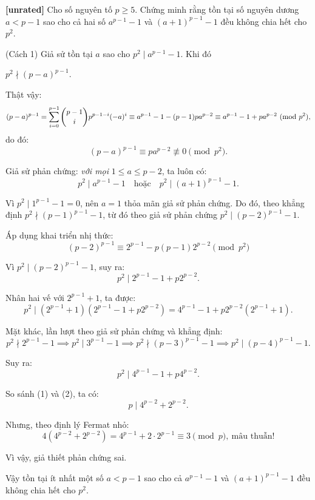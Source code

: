 \documentclass[../02-modular-arithmetic-b.tex]{subfiles}
\begin{document}
\begin{example*}\label{example:RUS-2015-D7-P5}\textbf{[unrated]}
	Cho số nguyên tố $p \ge 5$. Chứng minh rằng tồn tại số nguyên dương $a < p-1$ sao cho cả hai số $a^{p-1} - 1$ và $(a+1)^{p-1} - 1$ đều không chia hết cho $p^2$.
\end{example*}

\begin{soln}\footnotemark(Cách 1)
	Giả sử tồn tại $a$ sao cho $p^2 \mid a^{p-1} - 1$. Khi đó 
	\begin{claim*}
		$p^2 \nmid (p - a)^{p-1}$.
	\end{claim*}
	\begin{subproof}
		Thật vậy:
		\[
			(p - a)^{p-1} = \sum_{i=0}^{p-1} \binom{p-1}{i} p^{p-1-i} (-a)^i \equiv a^{p-1} - 1 - (p - 1)pa^{p-2} \equiv a^{p-1} - 1 + pa^{p-2} \ (\mathrm{mod}\ p^2),
		\]
		do đó:
		\[
			(p - a)^{p-1} \equiv pa^{p-2} \not\equiv 0 \pmod{p^2}.
		\]
	\end{subproof}

	Giả sử phản chứng: \emph{với mọi} $1 \le a \le p-2$, ta luôn có:
	\[
		p^2 \mid a^{p-1} - 1 \quad \text{hoặc} \quad p^2 \mid (a+1)^{p-1} - 1.
	\]
	
	Vì $p^2 \mid 1^{p-1} - 1 = 0$, nên $a = 1$ thỏa mãn giả sử phản chứng.
	Do đó, theo khẳng định $p^2 \nmid (p-1)^{p-1} - 1$, từ đó theo giả sử phản chứng $p^2 \mid (p - 2)^{p-1} - 1.$

	Áp dụng khai triển nhị thức:
	\[
		(p - 2)^{p-1} \equiv 2^{p-1} - p(p-1)2^{p-2} \pmod{p^2}
	\]
	
	Vì $p^2 \mid (p - 2)^{p-1} - 1$, suy ra:
	\[
		p^2 \mid 2^{p-1} - 1 + p2^{p-2}.
	\]
	
	Nhân hai vế với $2^{p-1} + 1$, ta được:
	\[
		p^2 \mid (2^{p-1} + 1)(2^{p-1} - 1 + p2^{p-2}) = 4^{p-1} - 1 + p2^{p-2}(2^{p-1} + 1). \tag{1}
	\]

	Mặt khác, lần lượt theo giả sử phản chứng và khẳng định:
	\[
		p^2 \nmid 2^{p-1} - 1 \implies p^2 \mid 3^{p-1} - 1 \implies p^2 \nmid (p - 3)^{p-1} - 1 \implies p^2 \mid (p - 4)^{p-1} - 1.
	\]
	
	Suy ra:
	\[
		p^2 \mid 4^{p-1} - 1 + p4^{p-2}. \tag{2}
	\]

	So sánh (1) và (2), ta có:
	\[
		p \mid 4^{p-2} + 2^{p-2}.
	\]
	
	Nhưng, theo định lý Fermat nhỏ:
	\[
		4(4^{p-2} + 2^{p-2}) = 4^{p-1} + 2 \cdot 2^{p-1} \equiv 3 \pmod{p},\ \text{mâu thuẫn!}
	\]
	
	Vì vậy, giả thiết phản chứng sai.

	Vậy tồn tại ít nhất một số $a < p-1$ sao cho cả $a^{p-1} - 1$ và $(a+1)^{p-1} - 1$ đều không chia hết cho $p^2$.
\end{soln}

\end{document}
